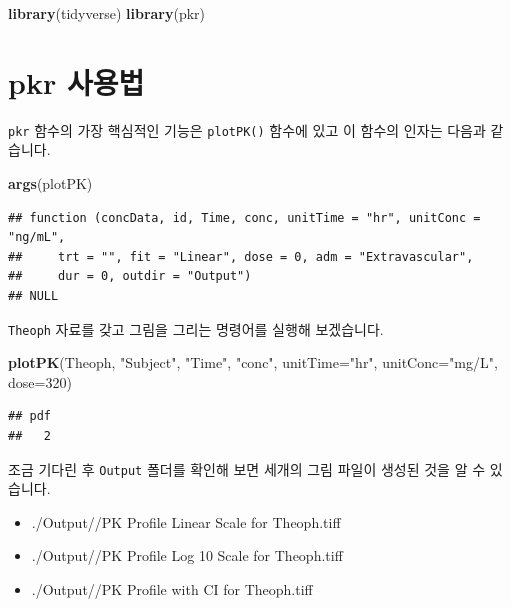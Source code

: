\documentclass[12pt,]{krantz}
\newenvironment{Shaded}{\begin{snugshade}}{\end{snugshade}}
\newcommand{\KeywordTok}[1]{\textcolor[rgb]{0.13,0.29,0.53}{\textbf{#1}}}
\newcommand{\DataTypeTok}[1]{\textcolor[rgb]{0.13,0.29,0.53}{#1}}
\newcommand{\DecValTok}[1]{\textcolor[rgb]{0.00,0.00,0.81}{#1}}
\newcommand{\StringTok}[1]{\textcolor[rgb]{0.31,0.60,0.02}{#1}}
\newcommand{\NormalTok}[1]{#1}
\providecommand{\tightlist}{%
  \setlength{\itemsep}{0pt}\setlength{\parskip}{0pt}}
\theoremstyle{definition}
\theoremstyle{definition}
\theoremstyle{definition}
\theoremstyle{remark}
\begin{document}
\begin{Shaded}
\begin{Highlighting}[]
\KeywordTok{library}\NormalTok{(tidyverse)}
\KeywordTok{library}\NormalTok{(pkr)}
\end{Highlighting}
\end{Shaded}

\section{pkr 사용법}\label{pkr-}

\texttt{pkr} 함수의 가장 핵심적인 기능은 \texttt{plotPK()} 함수에 있고
이 함수의 인자는 다음과 같습니다.

\begin{Shaded}
\begin{Highlighting}[]
\KeywordTok{args}\NormalTok{(plotPK)}
\end{Highlighting}
\end{Shaded}

\begin{verbatim}
## function (concData, id, Time, conc, unitTime = "hr", unitConc = "ng/mL", 
##     trt = "", fit = "Linear", dose = 0, adm = "Extravascular", 
##     dur = 0, outdir = "Output") 
## NULL
\end{verbatim}

\texttt{Theoph} 자료를 갖고 그림을 그리는 명령어를 실행해 보겠습니다.

\begin{Shaded}
\begin{Highlighting}[]
\KeywordTok{plotPK}\NormalTok{(Theoph, }\StringTok{"Subject"}\NormalTok{, }\StringTok{"Time"}\NormalTok{, }\StringTok{"conc"}\NormalTok{, }\DataTypeTok{unitTime=}\StringTok{"hr"}\NormalTok{, }\DataTypeTok{unitConc=}\StringTok{"mg/L"}\NormalTok{, }\DataTypeTok{dose=}\DecValTok{320}\NormalTok{)}
\end{Highlighting}
\end{Shaded}

\begin{verbatim}
## pdf 
##   2
\end{verbatim}

조금 기다린 후 \texttt{Output} 폴더를 확인해 보면 세개의 그림 파일이
생성된 것을 알 수 있습니다.

\begin{itemize}
\tightlist
\item
  ./Output//PK Profile Linear Scale for Theoph.tiff
\item
  ./Output//PK Profile Log 10 Scale for Theoph.tiff
\item
  ./Output//PK Profile with CI for Theoph.tiff
\end{itemize}
\end{document}
